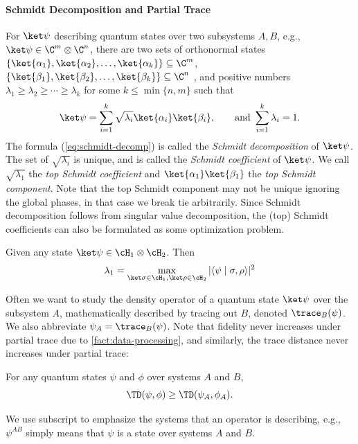 \paragraph{Schmidt Decomposition and Partial Trace} 
For $\ket\psi$ describing quantum states over two subsystems $A,B$, e.g., $\ket\psi\in\C^m \otimes \C^n$, there are two sets of orthonormal states $\{\ket{\alpha_1}, \ket{\alpha_2}, \ldots, \ket{\alpha_k}\}\subseteq \C^m$, $\{\ket{\beta_1}, \ket{\beta_2}, \ldots, \ket{\beta_k}\}\subseteq \C^n$ , and positive numbers $\lambda_1\ge \lambda_2\ge \cdots \ge \lambda_k$ for some $k\le \min\{n,m\}$ such that
\begin{equation}
    \ket\psi = \sum_{i=1}^k \sqrt{\lambda_i} \ket{\alpha_i}\ket{\beta_i}, \qquad \text{and } \sum_{i=1}^k \lambda_i = 1.\label{eq:schmidt-decomp}
\end{equation}
The formula (\ref{eq:schmidt-decomp}) is called the \emph{Schmidt decomposition} of $\ket\psi$. The set of $\sqrt{\lambda_i}$ is unique, and is called the \emph{Schmidt coefficient} of $\ket\psi$. 
We  call $\sqrt{\lambda_1}$ the \emph{top Schmidt coefficient} and $\ket{\alpha_1}\ket{\beta_1}$ the \emph{top Schmidt component}. 
Note that the top Schmidt component may not be unique ignoring the global phases, in that case we break  tie arbitrarily. Since Schmidt decomposition follows from singular value decomposition, the (top) Schmidt coefficients can also be formulated as some optimization problem.
\begin{claim}\label{claim:top-schmidt-coeff}
Given any state $\ket\psi\in \cH_1\otimes\cH_2$. Then
\begin{equation*}
    \lambda_1 = \max_{\ket\sigma\in \cH_1, \ket\rho\in\cH_2}|\langle \psi \mid \sigma,\rho \rangle |^2
\end{equation*}
\end{claim}

Often we want to study the density operator of a quantum state $\ket\psi$ over the subsystem $A$, mathematically described by tracing out $B$, denoted  $\trace_B(\psi)$.
We also abbreviate $\psi_A=\trace_B(\psi)$. Note that fidelity never increases under partial trace due to \cref{fact:data-processing}, and similarly, the trace distance never increases under partial trace:
\begin{fact} \label{fact:trace-dist-partial-trace}
For any quantum states $\psi$ and $\phi$ over systems $A$ and $B$,
\[
    \TD(\psi, \phi) \ge \TD(\psi_A, \phi_A).
\]
\end{fact}
We use subscript to emphasize the systems that an operator is describing, e.g., $\psi^{AB}$ simply means that $\psi$ is a state over systems $A$ and $B$.

